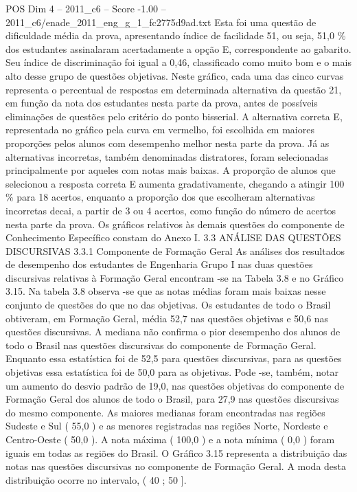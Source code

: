 \begin{textsample}{POS Dim 4 – 2011\_c6 – Score -1.00 – 2011\_c6/enade\_2011\_eng\_g\_1\_fc2775d9ad.txt}
Esta foi uma questão de dificuldade média da prova, apresentando índice de facilidade 51, ou seja, 51,0 \% dos estudantes assinalaram acertadamente a opção E, correspondente ao gabarito.
Seu índice de discriminação foi igual a 0,46, classificado como muito bom e o mais alto desse grupo de questões objetivas.
Neste gráfico, cada uma das cinco curvas representa o percentual de respostas em determinada alternativa da questão 21, em função da nota dos estudantes nesta parte da prova, antes de possíveis eliminações de questões pelo critério do ponto bisserial.
A alternativa correta E, representada no gráfico pela curva em vermelho, foi escolhida em maiores proporções pelos alunos com desempenho melhor nesta parte da prova.
Já as alternativas incorretas, também denominadas distratores, foram selecionadas principalmente por aqueles com notas mais baixas.
A proporção de alunos que selecionou a resposta correta E aumenta gradativamente, chegando a atingir 100 \% para 18 acertos, enquanto a proporção dos que escolheram alternativas incorretas decai, a partir de 3 ou 4 acertos, como função do número de acertos nesta parte da prova.
Os gráficos relativos às demais questões do componente de Conhecimento Específico constam do Anexo I. 3.3 ANÁLISE DAS QUESTÕES DISCURSIVAS 3.3.1 Componente de Formação Geral As análises dos resultados de desempenho dos estudantes de Engenharia Grupo I nas duas questões discursivas relativas à Formação Geral encontram -se na Tabela 3.8 e no Gráfico 3.15.
Na tabela 3.8 observa -se que as notas médias foram mais baixas nesse conjunto de questões do que no das objetivas.
Os estudantes de todo o Brasil obtiveram, em Formação Geral, média 52,7 nas questões objetivas e 50,6 nas questões discursivas.
A mediana não confirma o pior desempenho dos alunos de todo o Brasil nas questões discursivas do componente de Formação Geral.
Enquanto essa estatística foi de 52,5 para questões discursivas, para as questões objetivas essa estatística foi de 50,0 para as objetivas.
Pode -se, também, notar um aumento do desvio padrão de 19,0, nas questões objetivas do componente de Formação Geral dos alunos de todo o Brasil, para 27,9 nas questões discursivas do mesmo componente.
As maiores medianas foram encontradas nas regiões Sudeste e Sul ( 55,0 ) e as menores registradas nas regiões Norte, Nordeste e Centro-Oeste ( 50,0 ).
A nota máxima ( 100,0 ) e a nota mínima ( 0,0 ) foram iguais em todas as regiões do Brasil.
O Gráfico 3.15 representa a distribuição das notas nas questões discursivas no componente de Formação Geral.
A moda desta distribuição ocorre no intervalo, ( 40 ; 50 ].

\end{textsample}
